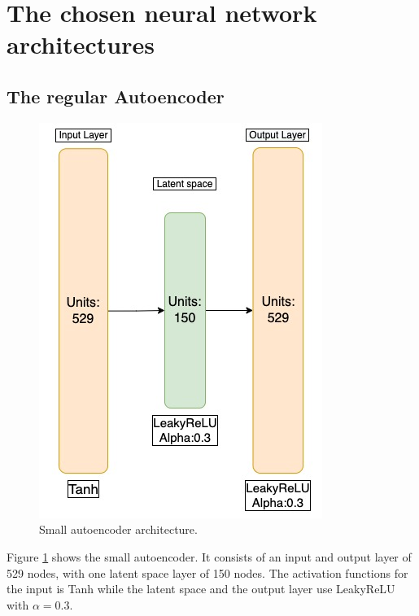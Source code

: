 \section{The chosen neural network architectures}

\subsection*{The regular Autoencoder}

\begin{figure}[h!]
    \centering
    \includegraphics[scale=0.4]{Figures/nnarchitect/ae_small.jpeg}
    \caption[AE | Small network architecture]{Small autoencoder architecture.}
    \label{fig:ae_small}
\end{figure}

Figure \ref{fig:ae_small} shows the small autoencoder. It consists of an input and output layer of 529 nodes, with 
one latent space layer of 150 nodes. The activation functions for the input is Tanh while the latent space and the 
output layer use LeakyReLU with $\alpha=0.3$.



